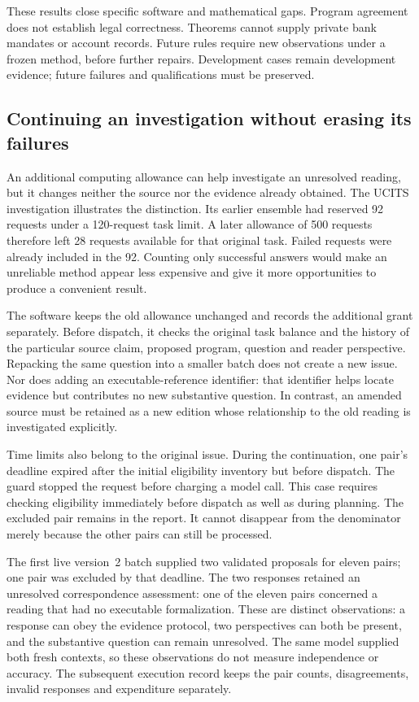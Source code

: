 These results close specific software and mathematical gaps. Program agreement
does not establish legal correctness. Theorems cannot supply private bank
mandates or account records. Future rules require new observations under a
frozen method, before further repairs. Development cases remain development
evidence; future failures and qualifications must be preserved.

\subsection{Continuing an investigation without erasing its failures}
\label{sec:continued-investigation}

An additional computing allowance can help investigate an unresolved reading,
but it changes neither the source nor the evidence already obtained. The UCITS
investigation illustrates the distinction. Its earlier ensemble had reserved
92 requests under a 120-request task limit. A later allowance of 500 requests
therefore left 28 requests available for that original task. Failed requests
were already included in the 92. Counting only successful answers would make
an unreliable method appear less expensive and give it more opportunities to
produce a convenient result.

The software keeps the old allowance unchanged and records the additional
grant separately. Before dispatch, it checks the original task balance and the
history of the particular source claim, proposed program, question and reader
perspective. Repacking the same question into a smaller batch does not create
a new issue. Nor does adding an executable-reference identifier: that identifier
helps locate evidence but contributes no new substantive question. In contrast,
an amended source must be retained as a new edition whose relationship to the
old reading is investigated explicitly.

Time limits also belong to the original issue. During the continuation, one
pair's deadline expired after the initial eligibility inventory but before
dispatch. The guard stopped the request before charging a model call. This
case requires checking eligibility immediately before dispatch as well as
during planning. The excluded pair remains in the report. It cannot disappear
from the denominator merely because the other pairs can still be processed.

The first live version~2 batch supplied two validated proposals for eleven
pairs; one pair was excluded by that deadline. The two responses retained an
unresolved correspondence assessment: one of the eleven pairs concerned a
reading that had no executable formalization.
These are distinct observations: a response can obey the evidence protocol,
two perspectives can both be present, and the substantive question can remain
unresolved. The same model supplied both fresh contexts, so these observations
do not measure independence or accuracy. The subsequent execution record keeps
the pair counts, disagreements, invalid responses and expenditure separately.

